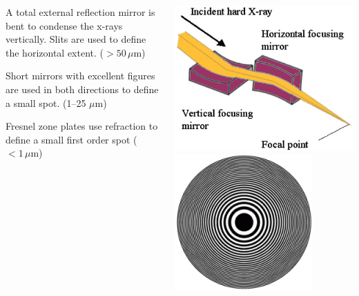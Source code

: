 \documentclass[10pt, xcolor=x11names, compress, handout]{beamer}
\begin{document}
\begin{frame}
  \begin{columns}
    \begin{column}{0.6\linewidth}
      \begin{description}[Refrac]
      \item[1D focussing + slits] A total external reflection mirror
        is bent to condense the x-rays vertically.  Slits are used to
        define the horizontal extent. ($>50\,\mu$m)
      \item[Kirkpatrick-Baez mirrors] Short mirrors with excellent
        figures are used in both directions to define a small
        spot. (1--25 $\mu$m)
      \item[Refractive optics] Fresnel zone plates use refraction to
        define a small first order spot ($<1\,\mu$m)
      \end{description}
    \end{column}
    \begin{column}{0.4\linewidth}
      \begin{center}
        \includegraphics[width=0.9\linewidth]{xrf/kb.png}\\[1ex]
        \includegraphics[width=0.7\linewidth]{xrf/zp.png}
      \end{center}

    \end{column}
  \end{columns}
\end{frame}
\end{document}
